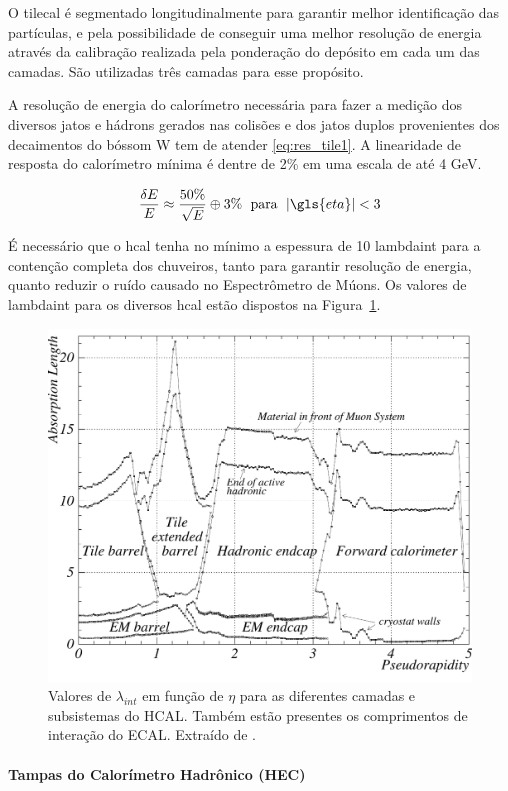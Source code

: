 O \gls{tilecal} é segmentado longitudinalmente para garantir melhor identificação
das partículas, e pela possibilidade de conseguir uma melhor resolução de
energia através da calibração realizada pela ponderação do depósito em cada um
das camadas. São utilizadas três camadas para esse propósito.

A resolução de energia do calorímetro necessária para fazer a medição dos
diversos jatos e hádrons gerados nas colisões e dos jatos duplos provenientes 
dos decaimentos do bóssom W tem de atender \ref{eq:res_tile1}. 
A linearidade de resposta do calorímetro mínima é dentre de 2\% em uma escala de até 4
GeV.

\begin{equation}\label{eq:res_tile1}
\frac{\delta E}{E} \approx \frac{50\%}{\sqrt{E}} \oplus 3\% \;\ \text{para} \;\
|\gls{eta}|<3
\end{equation}

É necessário que o \gls{hcal} tenha no mínimo a espessura de 10 \gls{lambdaint}
para a contenção completa dos chuveiros, tanto para garantir resolução de
energia, quanto reduzir o ruído causado no Espectrômetro de Múons. Os valores de
\gls{lambdaint} para os diversos \gls{hcal} estão dispostos na
Figura~\ref{fig:cal_had_lambda}.

\begin{figure}[h!t]
\centering
\includegraphics[width=.6\textwidth]{imagens/cal_had_lambda.pdf}
\caption[Valores de $\lambda_{int}$ em função de $\eta$ para as diferentes
camadas e subsistemas do calorímetro]{
Valores de $\lambda_{int}$ em função de $\eta$ para as diferentes
camadas e subsistemas do HCAL. Também estão presentes os comprimentos de interação do ECAL. 
Extraído de \cite{cal_tdr}.}
\label{fig:cal_had_lambda}
\end{figure}


\paragraph{Tampas do Calorímetro Hadrônico (HEC)}
\label{par:cal_hec}

